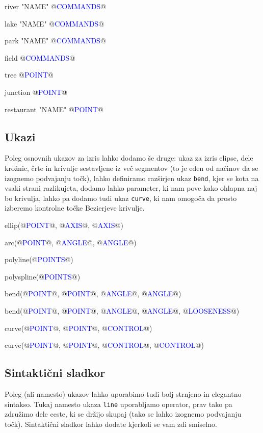 \documentclass{article}
\newcommand\Var[1]{\textcolor{blue}{#1}}
\newcommand\Fun[1]{{\texttt{#1}}}
\begin{document}
\begin{CITY}
  river "NAME" {
    @\Var{COMMANDS}@
  }

  lake "NAME" {
    @\Var{COMMANDS}@
  }

  park "NAME" {
    @\Var{COMMANDS}@
  }

  field {
    @\Var{COMMANDS}@
  }

  tree @\Var{POINT}@

  junction @\Var{POINT}@

  restaurant "NAME" @\Var{POINT}@
\end{CITY}

\subsection{Ukazi}
Poleg osnovnih ukazov za izris lahko dodamo še druge: ukaz za izris elipse, dele krožnic, črte in krivulje sestavljene iz več segmentov (to je eden od načinov da se izognemo podvajanju točk), lahko definiramo razširjen ukaz \Fun{bend}, kjer se kota na vsaki strani razlikujeta, dodamo lahko parameter, ki nam pove kako ohlapna naj bo krivulja, lahko pa dodamo tudi ukaz \Fun{curve}, ki nam omogoča da prosto izberemo kontrolne točke Bezierjeve krivulje.

\begin{CITY}
  ellip(@\Var{POINT}@, @\Var{AXIS}@, @\Var{AXIS}@)

  arc(@\Var{POINT}@, @\Var{ANGLE}@, @\Var{ANGLE}@)

  polyline(@\Var{POINTS}@)

  polyspline(@\Var{POINTS}@)

  bend(@\Var{POINT}@, @\Var{POINT}@, @\Var{ANGLE}@, @\Var{ANGLE}@)

  bend(@\Var{POINT}@, @\Var{POINT}@, @\Var{ANGLE}@, @\Var{ANGLE}@, @\Var{LOOSENESS}@)

  curve(@\Var{POINT}@, @\Var{POINT}@, @\Var{CONTROL}@)

  curve(@\Var{POINT}@, @\Var{POINT}@, @\Var{CONTROL}@, @\Var{CONTROL}@)
\end{CITY}

\subsection{Sintaktični sladkor}
Poleg (ali namesto) ukazov lahko uporabimo tudi bolj strnjeno in elegantno sintakso.
Tukaj namesto ukaza \Fun{line} uporabljamo operator, prav tako pa združimo dele ceste, ki se držijo skupaj (tako se lahko izognemo podvajanju točk).
Sintaktični sladkor lahko dodate kjerkoli se vam zdi smiselno.
\end{document}
